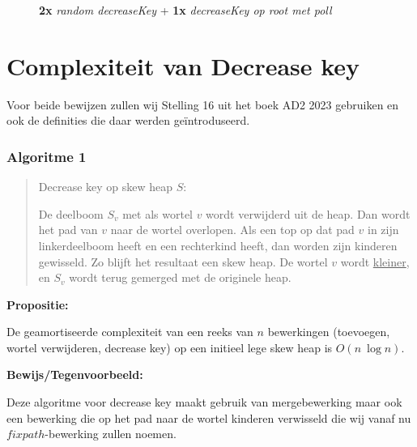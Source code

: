 \documentclass[12pt,a4paper,fleqn]{report}
\begin{document}
\begin{figure}[htbp]
\begin{minipage}{\textwidth}
\begin{subfigure}{0.45\textwidth}
		\end{subfigure}
	\end{minipage}
	\caption{\textbf{2x} \textit{random decreaseKey} + \textbf{1x} \textit{decreaseKey op
			root met poll}}
\end{figure}

	\pagebreak

	\section{Complexiteit van Decrease key}
	Voor beide bewijzen zullen wij Stelling 16 uit het boek AD2 2023 gebruiken en
	ook de definities die daar werden geïntroduseerd.

	\subsubsection{Algoritme 1}
	\begin{quote}
		Decrease key op skew heap $S$:

		De deelboom $S_{v}$ met als wortel $v$ wordt verwijderd uit de heap. Dan wordt het pad van
		$v$ naar de wortel overlopen. Als een top op dat pad $v$ in zijn linkerdeelboom heeft en
		een rechterkind heeft, dan worden zijn kinderen gewisseld. Zo blijft het resultaat een
		skew heap. De wortel $v$ wordt \underline{kleiner}, en
		$S_{v}$ wordt terug gemerged met de originele heap.
	\end{quote}

	\textbf{Propositie:}

	De geamortiseerde complexiteit van een reeks van $n$ bewerkingen
	(toevoegen, wortel verwijderen, decrease key) op een initieel lege skew heap is $O(n\ \log n)$.
	\newline

	\textbf{Bewijs/Tegenvoorbeeld:}

	Deze algoritme voor decrease key maakt gebruik van mergebewerking
	maar ook een bewerking die op het pad naar de wortel kinderen
	verwisseld die wij vanaf nu $fixpath$-bewerking zullen noemen.
	\newline
\end{document}
